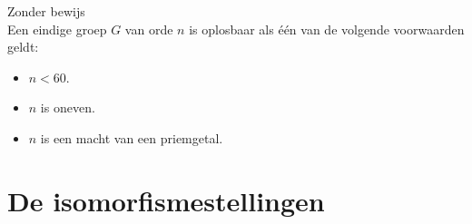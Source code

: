 \documentclass[main.tex]{subfiles}
\begin{document}
\begin{st}
  Zonder bewijs\\
  Een eindige groep $G$ van orde $n$ is oplosbaar als \'e\'en van de volgende voorwaarden geldt:
  \begin{itemize}
  \item $n < 60$.
  \item $n$ is oneven.
  \item $n$ is een macht van een priemgetal.
  \end{itemize}
\end{st}

\section{De isomorfismestellingen}
\label{sec:isomorfismestellingen}
\end{document}

